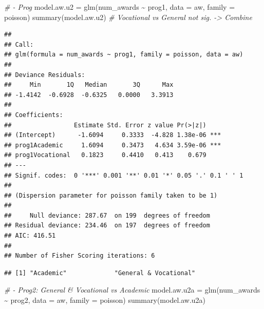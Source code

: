 \documentclass[
]{book}
\makeatletter
\newenvironment{Shaded}{\begin{snugshade}}{\end{snugshade}}
\newcommand{\AttributeTok}[1]{\textcolor[rgb]{0.61,0.61,0.61}{#1}}
\newcommand{\CommentTok}[1]{\textcolor[rgb]{0.37,0.37,0.37}{\textit{#1}}}
\newcommand{\FunctionTok}[1]{\textcolor[rgb]{0,0,0}{#1}}
\newcommand{\NormalTok}[1]{#1}
\newcommand{\OtherTok}[1]{\textcolor[rgb]{0.37,0.37,0.37}{#1}}
\newcommand{\SpecialCharTok}[1]{\textcolor[rgb]{0,0,0}{#1}}
\newcommand{\StringTok}[1]{\textcolor[rgb]{0.5,0.5,0.5}{#1}}
\newenvironment{kframe}{%
\medskip{}
\setlength{\fboxsep}{.8em}
 \def\at@end@of@kframe{}%
 \ifinner\ifhmode%
  \def\at@end@of@kframe{\end{minipage}}%
  \begin{minipage}{\columnwidth}%
 \fi\fi%
 \def\FrameCommand##1{\hskip\@totalleftmargin \hskip-\fboxsep
 \colorbox{shadecolor}{##1}\hskip-\fboxsep
     \hskip-\linewidth \hskip-\@totalleftmargin \hskip\columnwidth}%
 \MakeFramed {\advance\hsize-\width
   \@totalleftmargin\z@ \linewidth\hsize
   \@setminipage}}%
 {\par\unskip\endMakeFramed%
 \at@end@of@kframe}
\renewenvironment{Shaded}{\begin{kframe}}{\end{kframe}}
\makeatother
\begin{document}
\begin{Shaded}
\begin{Highlighting}[]
\CommentTok{\# {-} Prog}
\NormalTok{model.aw.u2 }\OtherTok{=} \FunctionTok{glm}\NormalTok{(num\_awards }\SpecialCharTok{\textasciitilde{}}\NormalTok{ prog1, }\AttributeTok{data =}\NormalTok{ aw, }\AttributeTok{family =}\NormalTok{ poisson)}
\FunctionTok{summary}\NormalTok{(model.aw.u2) }\CommentTok{\# Vocational vs General not sig. {-}\textgreater{} Combine}
\end{Highlighting}
\end{Shaded}

\begin{verbatim}
## 
## Call:
## glm(formula = num_awards ~ prog1, family = poisson, data = aw)
## 
## Deviance Residuals: 
##     Min       1Q   Median       3Q      Max  
## -1.4142  -0.6928  -0.6325   0.0000   3.3913  
## 
## Coefficients:
##                 Estimate Std. Error z value Pr(>|z|)    
## (Intercept)      -1.6094     0.3333  -4.828 1.38e-06 ***
## prog1Academic     1.6094     0.3473   4.634 3.59e-06 ***
## prog1Vocational   0.1823     0.4410   0.413    0.679    
## ---
## Signif. codes:  0 '***' 0.001 '**' 0.01 '*' 0.05 '.' 0.1 ' ' 1
## 
## (Dispersion parameter for poisson family taken to be 1)
## 
##     Null deviance: 287.67  on 199  degrees of freedom
## Residual deviance: 234.46  on 197  degrees of freedom
## AIC: 416.51
## 
## Number of Fisher Scoring iterations: 6
\end{verbatim}

\begin{Shaded}
\end{Shaded}

\begin{verbatim}
## [1] "Academic"             "General & Vocational"
\end{verbatim}

\begin{Shaded}
\begin{Highlighting}[]
\CommentTok{\# {-} Prog2: General \& Vocational vs Academic}
\NormalTok{model.aw.u2a }\OtherTok{=} \FunctionTok{glm}\NormalTok{(num\_awards }\SpecialCharTok{\textasciitilde{}}\NormalTok{ prog2, }\AttributeTok{data =}\NormalTok{ aw, }\AttributeTok{family =}\NormalTok{ poisson)}
\FunctionTok{summary}\NormalTok{(model.aw.u2a)}
\end{Highlighting}
\end{Shaded}
\end{document}
